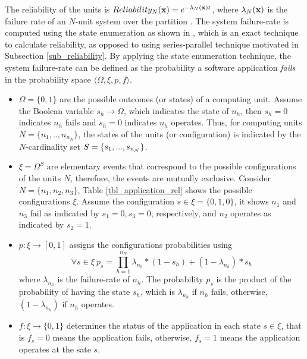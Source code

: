 The reliability of the units is $Reliability_N(\textbf{x})=e^{-\lambda_N(\textbf{x}) t}$, where $\lambda_N(\textbf{x})$ is the failure rate of an $N$-unit system over the partition \ttx. The system failure-rate is computed using the state enumeration as shown in \cite{Lucet1999ExactReliability}, which is an exact technique to calculate reliability, as opposed to using series-parallel technique motivated in Subsection \ref{sub_reliability}. By applying the state enumeration technique, the system failure-rate can be defined as the probability a software application \textit{fails} in the probability space $\langle \Omega,\xi,p,f\rangle$.
\begin{itemize}
	\item $\Omega=\{0,1\}$ are the possible outcomes (or states) of a computing unit. Assume the Boolean variable $s_h\rightarrow\Omega$, which indicates the state of $n_h$, then $s_h=0$ indicates $n_h$ fails and $s_h=0$ indicates $n_h$ operates. Thus, for computing units $N=\{n_1,..,n_{n_N}\}$, the states of the units (or configuration) is indicated by the $N$-cardinality set $S=\{s_1,...,s_{n_{\mathcal{N}}}\}$.
	
	\item $\xi=\Omega^S$ are elementary events that correspond to the possible configurations of the units $N$, therefore, the events are mutually exclusive. Consider $N=\{n_1,n_2,n_3\}$, Table \ref{tbl_application_rel} shows the possible configurations $\xi$. Assume the configuration $s\in \xi=\{0,1,0\}$, it shows $n_1$ and $n_3$ fail as indicated by $s_1=0,s_3=0$, respectively, and $n_2$ operates as indicated by $s_2=1$. 
	
	\item $p:\xi\rightarrow[0,1]$ assigns the configurations probabilities using
	\[\forall s\in \xi\  p_s=\prod_{h=1}^{n_N}{\lambda_{n_h}*(1-s_h)+(1-\lambda_{n_h})*s_h}\]
	where $\lambda_{n_h}$ is the failure-rate of $n_h$. The probability $p_s$ is the product of the probability of having the state $s_h$, which is $\lambda_{n_h}$ if $n_h$ fails, otherwise, $(1-\lambda_{n_h})$ if $n_h$ operates.
	
	\item $f:\xi\rightarrow \{0,1\}$ determines the status of the application in each state $s\in\xi$, that is $f_s=0$ means the application fails, otherwise, $f_s=1$ means the application operates at the sate $s$.
\end{itemize}

